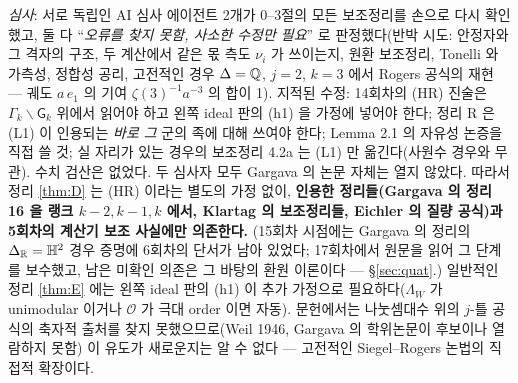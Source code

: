 \emph{심사}: 서로 독립인 AI 심사 에이전트 2개가 0--3절의 모든 보조정리를 손으로 다시 확인했고, 둘 다 ``\emph{오류를 찾지 못함, 사소한 수정만 필요}'' 로 판정했다(반박 시도: 안정자와 그 격자의 구조, 두 계산에서 같은 몫 측도 $\nu_i$ 가 쓰이는지, 원환 보조정리, Tonelli 와 가측성, 정합성 공리, 고전적인 경우 $\Delta=\mathbb{Q}$, $j=2$, $k=3$ 에서 Rogers 공식의 재현 --- 궤도 $a\,e_1$ 의 기여 $\zeta(3)^{-1}a^{-3}$ 의 합이 1). 지적된 수정: 14회차의 (HR) 진술은 $\Gamma_k\backslash\mathsf G_k$ 위에서 읽어야 하고 왼쪽 ideal 판의 (h1) 을 가정에 넣어야 한다; 정리 R 은 (L1) 이 인용되는 \emph{바로 그} 군의 족에 대해 쓰여야 한다; Lemma 2.1 의 자유성 논증을 직접 쓸 것; 실 자리가 있는 경우의 보조정리 4.2a 는 (L1) 만 옮긴다(사원수 경우와 무관). 수치 검산은 없었다. 두 심사자 모두 Gargava 의 논문 자체는 열지 않았다. 따라서 정리 \ref{thm:D} 는 (HR) 이라는 별도의 가정 없이, \textbf{인용한 정리들(Gargava 의 정리 16 을 랭크 $k-2,k-1,k$ 에서, Klartag 의 보조정리들, Eichler 의 질량 공식)과 5회차의 계산기 보조 사실에만 의존한다.} (15회차 시점에는 Gargava 의 정리의 $\Delta_{\mathbb{R}}=\mathbb{H}^2$ 경우 증명에 6회차의 단서가 남아 있었다; 17회차에서 원문을 읽어 그 단계를 보수했고, 남은 미확인 의존은 그 바탕의 환원 이론이다 --- \S\ref{sec:quat}.) 일반적인 정리 \ref{thm:E} 에는 왼쪽 ideal 판의 (h1) 이 추가 가정으로 필요하다($\Lambda_W$ 가 unimodular 이거나 $\mathcal O$ 가 극대 order 이면 자동). 문헌에서는 나눗셈대수 위의 $j$-틀 공식의 축자적 출처를 찾지 못했으므로(Weil 1946, Gargava 의 학위논문이 후보이나 열람하지 못함) 이 유도가 새로운지는 알 수 없다 --- 고전적인 Siegel--Rogers 논법의 직접적 확장이다.

